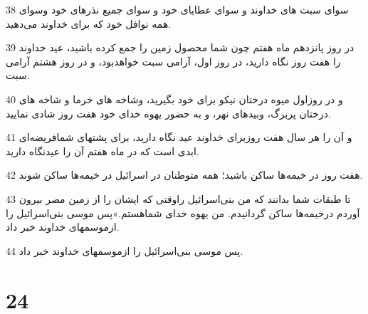 \par 38 سوای سبت های خداوند و سوای عطایای خود و سوای جمیع نذرهای خود وسوای همه نوافل خود که برای خداوند می‌دهید.
\par 39 در روز پانزدهم ماه هفتم چون شما محصول زمین را جمع کرده باشید، عید خداوند را هفت روز نگاه دارید، در روز اول، آرامی سبت خواهدبود، و در روز هشتم آرامی سبت.
\par 40 و در روزاول میوه درختان نیکو برای خود بگیرید، وشاخه های خرما و شاخه های درختان پربرگ، وبیدهای نهر، و به حضور یهوه خدای خود هفت روز شادی نمایید.
\par 41 و آن را هر سال هفت روزبرای خداوند عید نگاه دارید، برای پشتهای شمافریضه‌ای ابدی است که در ماه هفتم آن را عیدنگاه دارید.
\par 42 هفت روز در خیمه‌ها ساکن باشید؛ همه متوطنان در اسرائیل در خیمه‌ها ساکن شوند.
\par 43 تا طبقات شما بدانند که من بنی‌اسرائیل راوقتی که ایشان را از زمین مصر بیرون آوردم درخیمه‌ها ساکن گردانیدم. من یهوه خدای شماهستم.»پس موسی بنی‌اسرائیل را ازموسمهای خداوند خبر داد.
\par 44 پس موسی بنی‌اسرائیل را ازموسمهای خداوند خبر داد.
 
\chapter{24}

